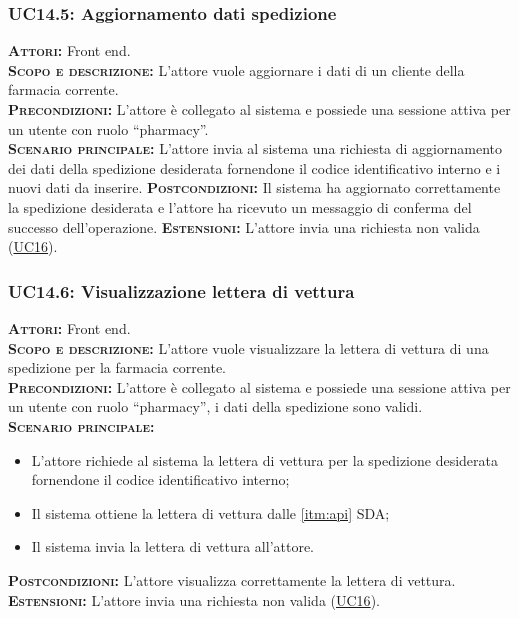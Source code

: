 \subsubsection{UC14.5: Aggiornamento dati spedizione}
\label{sec:UC145}
\textsc{\textbf{Attori:}} Front end.\\
\textsc{\textbf{Scopo e descrizione:}} L'attore vuole aggiornare i dati di un cliente della farmacia corrente.\\
\textsc{\textsc{\textbf{Precondizioni:}}} L'attore è collegato al sistema e possiede una sessione attiva per un utente con ruolo ``pharmacy''.\\
\textsc{\textbf{Scenario principale:}} L'attore invia al sistema una richiesta di aggiornamento dei dati della spedizione desiderata fornendone il codice identificativo interno e i nuovi dati da inserire.
\textsc{\textbf{Postcondizioni:}} Il sistema ha aggiornato correttamente la spedizione desiderata e l'attore ha ricevuto un messaggio di conferma del successo dell'operazione.
\textsc{\textbf{Estensioni:}} L'attore invia una richiesta non valida (\hyperref[sec:UC16]{UC16}).

\subsubsection{UC14.6: Visualizzazione lettera di vettura}
\label{sec:UC146}
\textsc{\textbf{Attori:}} Front end.\\
\textsc{\textbf{Scopo e descrizione:}} L'attore vuole visualizzare la lettera di vettura di una spedizione per la farmacia corrente.\\
\textsc{\textsc{\textbf{Precondizioni:}}} L'attore è collegato al sistema e possiede una sessione attiva per un utente con ruolo ``pharmacy'', i dati della spedizione sono validi.\\
\textsc{\textbf{Scenario principale:}} 
\begin{itemize}
    \item L'attore richiede al sistema la lettera di vettura per la spedizione desiderata fornendone il codice identificativo interno;
    \item Il sistema ottiene la lettera di vettura dalle \ref{itm:api} SDA;
    \item Il sistema invia la lettera di vettura all'attore.
\end{itemize}
\textsc{\textbf{Postcondizioni:}} L'attore visualizza correttamente la lettera di vettura.\\
\textsc{\textbf{Estensioni:}} L'attore invia una richiesta non valida (\hyperref[sec:UC16]{UC16}).


